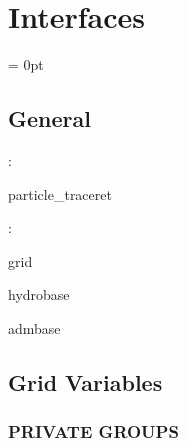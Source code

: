 
\section{Interfaces} 


\parskip = 0pt

\vspace{3mm} \subsection*{General}

: 

particle\_traceret
\vspace{2mm}

: 

grid

hydrobase

admbase
\vspace{2mm}
\subsection*{Grid Variables}
\vspace{5mm}\subsubsection{PRIVATE GROUPS}

\vspace{5mm}

